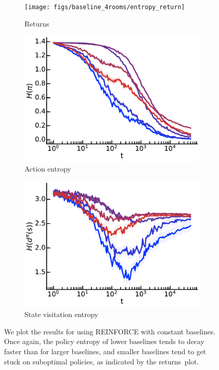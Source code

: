 \begin{figure}[!ht]
\centering
  \begin{subfigure}[b]{0.32\linewidth}
    \texttt{[image: figs/baseline\_4rooms/entropy\_return]}
    \caption{Returns}
  \end{subfigure}
    \begin{subfigure}[b]{0.32\linewidth}
    \includegraphics[width=\textwidth]{articles/baselines/figs/baseline_4rooms/entropy_pi}
    \caption{Action entropy}
  \end{subfigure}
  \begin{subfigure}[b]{0.32\linewidth}
    \includegraphics[width=\textwidth]{articles/baselines/figs/baseline_4rooms/entropy_ds}
    \caption{State visitation entropy}
  \end{subfigure}
  \caption{We plot the results for using REINFORCE with constant baselines. Once again, the policy entropy of lower baselines tends to decay faster than for larger baselines, and smaller baselines tend to get stuck on suboptimal policies, as indicated by the returns~plot.~\label{appfig:4rooms_vpg_constant_baselines}}
\end{figure}

